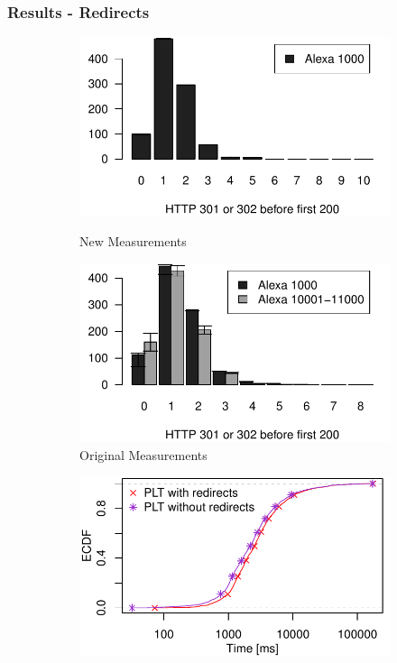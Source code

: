 \begin{frame}
    \frametitle{Results - Redirects}
\begin{figure}
 \centering
 \begin{subfigure}{0.5\textwidth}
 \centering
	\includegraphics[width=.8\linewidth,keepaspectratio]{New_Plots/barplot_redirects_clean.pdf}
	\caption{New Measurements}
	\label{fig:new_bar_redirects}
	\par\medskip
	\includegraphics[width=.8\linewidth,keepaspectratio]{Original Plots/barplot_redirects.pdf}
	\caption{Original Measurements}
	\label{fig:orig_bar_redirects}
	\end{subfigure}%
	 \begin{subfigure}{0.5\textwidth}
	 \centering
	\includegraphics[width=.8\linewidth,keepaspectratio]{New_Plots/ecdf_loadtimes.pdf}

\end{subfigure}
\end{figure}
\end{frame}
